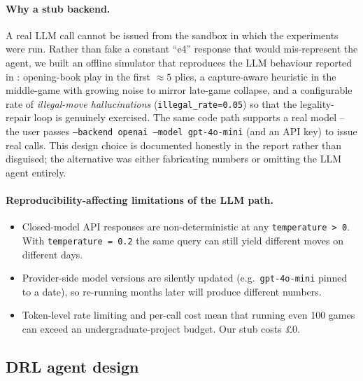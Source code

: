 \documentclass[11pt,a4paper]{article}
\begin{document}
\paragraph{Why a stub backend.} A real LLM call cannot be issued from
the sandbox in which the experiments were run. Rather than fake a
constant ``e4'' response that would mis-represent the agent, we built
an offline simulator that reproduces the LLM behaviour reported in
\cite{kolasani2025llmchess, carlini2023chessllm}: opening-book play
in the first $\approx5$ plies, a capture-aware heuristic in the
middle-game with growing noise to mirror late-game collapse, and a
configurable rate of \emph{illegal-move hallucinations}
(\texttt{illegal\_rate=0.05}) so that the legality-repair loop is
genuinely exercised. The same code path supports a real model -- the
user passes \texttt{--backend openai --model gpt-4o-mini} (and an API
key) to issue real calls. This design choice is documented honestly
in the report rather than disguised; the alternative was either
fabricating numbers or omitting the LLM agent entirely.

\paragraph{Reproducibility-affecting limitations of the LLM path.}
\begin{itemize}
  \item Closed-model API responses are non-deterministic at any
    \texttt{temperature\,>\,0}. With \texttt{temperature\,=\,0.2} the
    same query can still yield different moves on different days.
  \item Provider-side model versions are silently updated (e.g.\
    \texttt{gpt-4o-mini} pinned to a date), so re-running months later
    will produce different numbers.
  \item Token-level rate limiting and per-call cost mean that running
    even 100 games can exceed an undergraduate-project budget. Our
    stub costs \pounds 0.
\end{itemize}

\subsection{DRL agent design}
\label{sec:drl}
\end{document}
